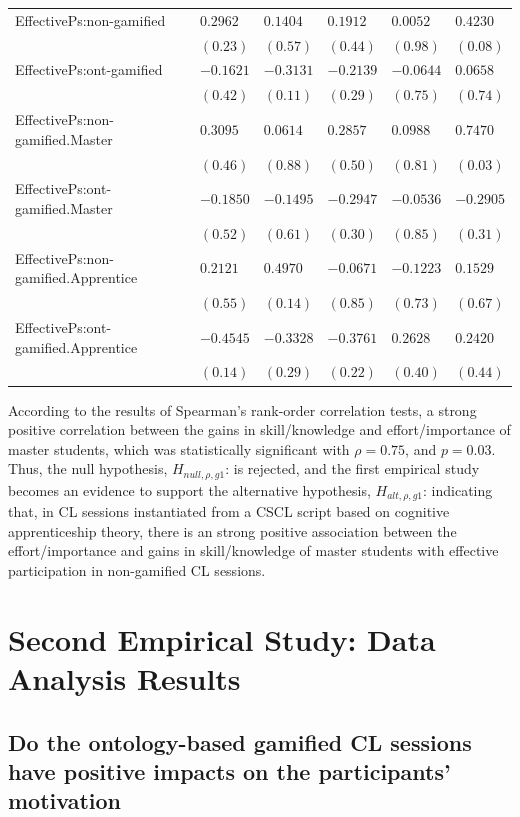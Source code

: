 {\begin{longtable}{lR{1.5cm}R{1.5cm}R{1.5cm}R{1.5cm}R{1.5cm}}
EffectivePs:non-gamified&$ 0.2962$&$ 0.1404$&$ 0.1912$&$ 0.0052$&$0.4230$\tabularnewline
 &$(0.23)$&$(0.57)$&$(0.44)$&$(0.98)$&$(0.08)$\tabularnewline
EffectivePs:ont-gamified&$-0.1621$&$-0.3131$&$-0.2139$&$-0.0644$&$ 0.0658$\tabularnewline
 &$(0.42)$&$(0.11)$&$(0.29)$&$(0.75)$&$(0.74)$\tabularnewline
EffectivePs:non-gamified.Master&$ 0.3095$&$ 0.0614$&$ 0.2857$&$ 0.0988$&$0.7470$\tabularnewline
 &$(0.46)$&$(0.88)$&$(0.50)$&$(0.81)$&$(0.03)$\tabularnewline
EffectivePs:ont-gamified.Master&$-0.1850$&$-0.1495$&$-0.2947$&$-0.0536$&$-0.2905$\tabularnewline
 &$(0.52)$&$(0.61)$&$(0.30)$&$(0.85)$&$(0.31)$\tabularnewline
EffectivePs:non-gamified.Apprentice&$ 0.2121$&$ 0.4970$&$-0.0671$&$-0.1223$&$ 0.1529$\tabularnewline
 &$(0.55)$&$(0.14)$&$(0.85)$&$(0.73)$&$(0.67)$\tabularnewline
EffectivePs:ont-gamified.Apprentice&$-0.4545$&$-0.3328$&$-0.3761$&$ 0.2628$&$ 0.2420$\tabularnewline
 &$(0.14)$&$(0.29)$&$(0.22)$&$(0.40)$&$(0.44)$\tabularnewline
\hline
\end{longtable}}%

According to the results of Spearman's rank-order correlation tests, a strong positive correlation between the gains in skill/knowledge and effort/importance of master students, which was statistically significant with $\rho = 0.75$, and $p = 0.03$.
Thus, the null hypothesis, $H_{null,\rho,g1}$:  is rejected, and the first empirical study becomes an evidence to support the alternative hypothesis, $H_{alt,\rho,g1}$:  indicating that, in CL sessions instantiated from a CSCL script based on cognitive apprenticeship theory, there is an strong positive association between the effort/importance and gains in skill/knowledge of master students with effective participation in non-gamified CL sessions.

\section{Second Empirical Study: Data Analysis Results}
\label{sec:second-study}

\subsection*{Do the ontology-based gamified CL sessions have positive impacts on the participants' motivation}

